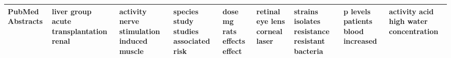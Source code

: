 \documentclass[11pt,a4paper]{article}
\begin{document}
\begin{appendices}
\begin{table*}[htp]
\begin{tiny}
\begin{tabular}{|p{}|p{}|p{}|p{}|p{}|p{}|p{}|p{}|p{}|}
PubMed Abstracts & liver \newline group \newline acute \newline transplantation \newline renal & activity \newline nerve \newline stimulation \newline induced \newline muscle & species \newline study \newline studies \newline associated \newline risk & dose \newline mg \newline rats \newline effects \newline effect & retinal \newline eye \newline lens \newline corneal \newline laser & strains \newline isolates \newline resistance \newline resistant \newline bacteria & p \newline levels \newline patients \newline blood \newline increased & activity \newline acid \newline high \newline water \newline concentration\\\hline

\end{tabular}
\end{tiny}
\end{table*}
\end{appendices}
\end{document}
